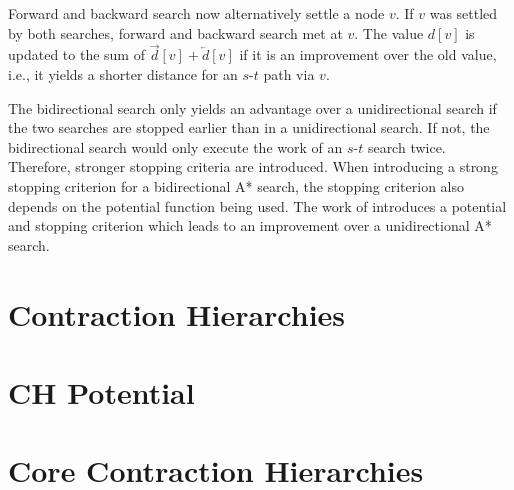 Forward and backward search now alternatively settle a node $v$. If $v$ was settled by both searches, forward and backward search met at $v$. The value $d[v]$ is updated to the sum of $\overrightarrow{d}[v] + \overleftarrow{d}[v]$ if it is an improvement over the old value, i.e., it yields a shorter distance for an $s$-$t$ path via $v$.

The bidirectional search only yields an advantage over a unidirectional search if the two searches are stopped earlier than in a unidirectional search. If not, the bidirectional search would only execute the work of an $s$-$t$ search twice. Therefore, stronger stopping criteria are introduced. When introducing a strong stopping criterion for a bidirectional A* search, the stopping criterion also depends on the potential function being used. The work of \cite{goldberg:2005} introduces a potential and stopping criterion which leads to an improvement over a unidirectional A* search.

\section{Contraction Hierarchies}
\label{sec:ch}
\section{CH Potential\label{sec:ch_pot}}
\section{Core Contraction Hierarchies}